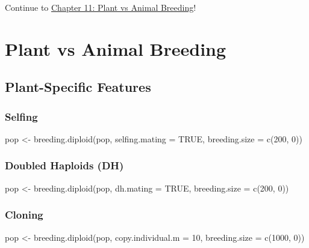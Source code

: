 \documentclass[
  letterpaper,
]{book}
\newenvironment{Shaded}{\begin{snugshade}}{\end{snugshade}}
\newcommand{\AttributeTok}[1]{\textcolor[rgb]{0.40,0.45,0.13}{#1}}
\newcommand{\ConstantTok}[1]{\textcolor[rgb]{0.56,0.35,0.01}{#1}}
\newcommand{\DecValTok}[1]{\textcolor[rgb]{0.68,0.00,0.00}{#1}}
\newcommand{\FunctionTok}[1]{\textcolor[rgb]{0.28,0.35,0.67}{#1}}
\newcommand{\NormalTok}[1]{\textcolor[rgb]{0.00,0.23,0.31}{#1}}
\newcommand{\OtherTok}[1]{\textcolor[rgb]{0.00,0.23,0.31}{#1}}
\begin{document}
Continue to \href{11-plant-vs-animal.qmd}{Chapter 11: Plant vs Animal
Breeding}!

\chapter{Plant vs Animal Breeding}\label{sec-plant-vs-animal}

\section{Plant-Specific Features}\label{plant-specific-features}

\subsection{Selfing}\label{selfing}

\begin{Shaded}
\begin{Highlighting}[]
\NormalTok{pop }\OtherTok{\textless{}{-}} \FunctionTok{breeding.diploid}\NormalTok{(pop, }\AttributeTok{selfing.mating =} \ConstantTok{TRUE}\NormalTok{, }\AttributeTok{breeding.size =} \FunctionTok{c}\NormalTok{(}\DecValTok{200}\NormalTok{, }\DecValTok{0}\NormalTok{))}
\end{Highlighting}
\end{Shaded}

\subsection{Doubled Haploids (DH)}\label{doubled-haploids-dh}

\begin{Shaded}
\begin{Highlighting}[]
\NormalTok{pop }\OtherTok{\textless{}{-}} \FunctionTok{breeding.diploid}\NormalTok{(pop, }\AttributeTok{dh.mating =} \ConstantTok{TRUE}\NormalTok{, }\AttributeTok{breeding.size =} \FunctionTok{c}\NormalTok{(}\DecValTok{200}\NormalTok{, }\DecValTok{0}\NormalTok{))}
\end{Highlighting}
\end{Shaded}

\subsection{Cloning}\label{cloning}

\begin{Shaded}
\begin{Highlighting}[]
\NormalTok{pop }\OtherTok{\textless{}{-}} \FunctionTok{breeding.diploid}\NormalTok{(pop, }\AttributeTok{copy.individual.m =} \DecValTok{10}\NormalTok{, }\AttributeTok{breeding.size =} \FunctionTok{c}\NormalTok{(}\DecValTok{1000}\NormalTok{, }\DecValTok{0}\NormalTok{))}
\end{Highlighting}
\end{Shaded}
\end{document}
